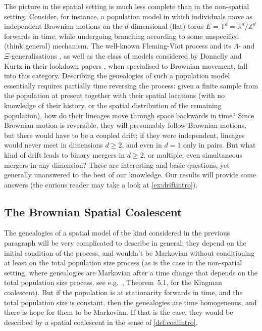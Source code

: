 \documentclass[reqno,draft]{amsart}
\numberwithin{equation}{section}
\theoremstyle{plain}
\theoremstyle{remark}
\newcommand{\R}{\mathbb{R}} %
\newcommand{\Z}{\mathbb{Z}} %
\begin{document}
The picture in the spatial setting is much less complete than in the non-spatial setting. Consider, for instance, a population model in which individuals move as independent Brownian motions on the $d$-dimensional (flat) torus $E = \mathbb{T}^d = \R^d / \Z^d$ forwards in time, while undergoing branching according to some unspecified (think general) mechanism. The well-known Fleming-Viot process and its $\Lambda$- and $\Xi$-generalisations \cite{DK96,BL2003,xiflemingviot}, as well as the class of models considered by Donnelly and Kurtz in their lookdown papers \cite{DK96,DK99}, when specialised to Brownian movement, fall into this category. %
Describing the genealogies of such a population model essentially requires partially time reversing the process: given a finite sample from the population at present together with their spatial locations (with no knowledge of their history, or the spatial distribution of the remaining population), how do their lineages move through space backwards in time? Since Brownian motion is reversible, they will presumably follow Brownian motions, but there would have to be a coupled drift; if they were independent, lineages would never meet in dimensions $d \ge 2$, and even in $d = 1$ only in pairs. But what kind of drift leads to binary mergers in $d \ge 2$, or multiple, even simultaneous mergers in any dimension? These are interesting and basic questions, yet generally unanswered to the best of our knowledge. Our results will provide some answers (the curious reader may take a look at \cref{ex:driftintro}).


\subsection{The Brownian Spatial Coalescent}\label{sec:introBSC}
The genealogies of a spatial model of the kind considered in the previous paragraph will be very complicated to describe in general; they depend on the initial condition of the process, and wouldn't be Markovian without conditioning at least on the total population size process (as is the case in the non-spatial setting, where genealogies are Markovian after a time change that depends on the total population size process, see e.g.\ \cite{DK99}, Theorem\ 5.1, for the Kingman coalescent).
But if the population is at stationarity forwards in time, and the total population size is constant, then the genealogies are time homogeneous, and there is hope for them to be Markovian. If that is the case, they would be described by a spatial coalescent in the sense of \cref{def:coalintro}.
\end{document}
